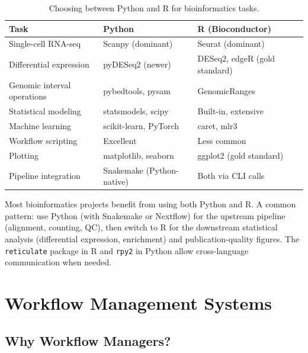 \begin{table}[htbp]
\centering
\caption{Choosing between Python and R for bioinformatics tasks.}
\label{tab:python-vs-r}
\small
\begin{tabularx}{\textwidth}{l X X}
\toprule
\textbf{Task} & \textbf{Python} & \textbf{R (Bioconductor)} \\
\midrule
Single-cell RNA-seq & Scanpy (dominant) & Seurat (dominant) \\
Differential expression & pyDESeq2 (newer) & DESeq2, edgeR (gold standard) \\
Genomic interval operations & pybedtools, pysam & GenomicRanges \\
Statistical modeling & statsmodels, scipy & Built-in, extensive \\
Machine learning & scikit-learn, PyTorch & caret, mlr3 \\
Workflow scripting & Excellent & Less common \\
Plotting & matplotlib, seaborn & ggplot2 (gold standard) \\
Pipeline integration & Snakemake (Python-native) & Both via CLI calls \\
\bottomrule
\end{tabularx}
\end{table}

\begin{tipbox}[title={Use Both Languages}]
Most bioinformatics projects benefit from using both Python and R. A common pattern: use Python (with Snakemake or Nextflow) for the upstream pipeline (alignment, counting, QC), then switch to R for the downstream statistical analysis (differential expression, enrichment) and publication-quality figures. The \texttt{reticulate} package in R and \texttt{rpy2} in Python allow cross-language communication when needed.
\end{tipbox}

\section{Workflow Management Systems}
\label{sec:bioinf:workflows}

\subsection{Why Workflow Managers?}
\label{subsec:bioinf:whywfm}

